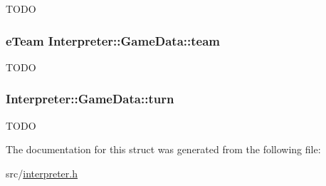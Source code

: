 \label{structInterpreter_1_1GameData_a92de919c4addb12feda7a29e40b95132}
TODO \hypertarget{structInterpreter_1_1GameData_a42e23781bbc08a16049f0478ba300424}{
\subsubsection[{team}]{\setlength{\rightskip}{0pt plus 5cm}eTeam {\bf Interpreter::GameData::team}}}
\label{structInterpreter_1_1GameData_a42e23781bbc08a16049f0478ba300424}
TODO \hypertarget{structInterpreter_1_1GameData_a149f7f05ee020674156346057e9b60ba}{
\subsubsection[{turn}]{ {\bf Interpreter::GameData::turn}}}
\label{structInterpreter_1_1GameData_a149f7f05ee020674156346057e9b60ba}
TODO 

The documentation for this struct was generated from the following file:\begin{DoxyCompactItemize}
\item 
src/\hyperlink{interpreter_8h}{interpreter.h}\end{DoxyCompactItemize}
